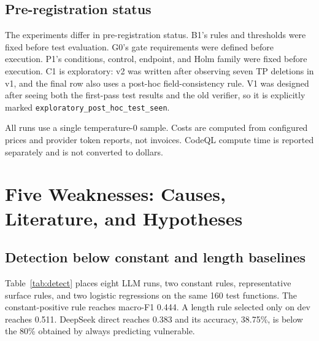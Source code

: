 \documentclass[conference]{IEEEtran}
\begin{document}
\subsection{Pre-registration status}
The experiments differ in pre-registration status. B1's rules and thresholds were fixed before test evaluation. G0's gate requirements were defined before execution. P1's conditions, control, endpoint, and Holm family were fixed before execution. C1 is exploratory: v2 was written after observing seven TP deletions in v1, and the final row also uses a post-hoc field-consistency rule. V1 was designed after seeing both the first-pass test results and the old verifier, so it is explicitly marked \texttt{exploratory\_post\_hoc\_test\_seen}.

All runs use a single temperature-0 sample. Costs are computed from configured prices and provider token reports, not invoices. CodeQL compute time is reported separately and is not converted to dollars.

\section{Five Weaknesses: Causes, Literature, and Hypotheses}
\label{sec:gaps}

\subsection{Detection below constant and length baselines}
\label{sec:gap-detect}

Table~\ref{tab:detect} places eight LLM runs, two constant rules, representative surface rules, and two logistic regressions on the same 160 test functions. The constant-positive rule reaches macro-F1 0.444. A length rule selected only on dev reaches 0.511. DeepSeek direct reaches 0.383 and its accuracy, 38.75\%, is below the 80\% obtained by always predicting vulnerable.
\end{document}
